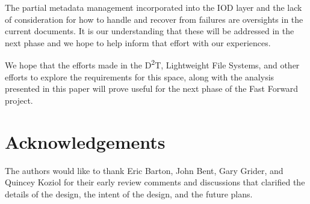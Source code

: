 \documentclass[conference]{IEEEtran}
\newcommand{\DDTns}{D\textsuperscript{2}T}
\begin{document}
The partial metadata management incorporated into the IOD layer and the lack of
consideration for how to handle and recover from failures are oversights in the
current documents. It is our understanding that these will be addressed in the
next phase and we hope to help inform that effort with our experiences.

We hope that the efforts made in the \DDTns, Lightweight File Systems, and
other efforts to explore the requirements for this space, along with the
analysis presented in this paper will prove useful for the next phase of the
Fast Forward project.

\section{Acknowledgements}
The authors would like to thank Eric Barton, John Bent, Gary Grider, and
Quincey Koziol for their early review comments and discussions that clarified
the details of the design, the intent of the design, and the future plans.
\end{document}
